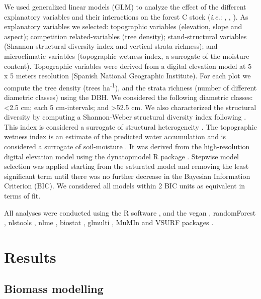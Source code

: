 We used generalized linear models (GLM) to analyze the effect of the different explanatory variables and their interactions on the forest C stock (\emph{i.e.}: \wt, \ws, \wro). As explanatory variables we selected: topographic variables (elevation, slope and aspect); competition related-variables (tree density); stand-structural variables (Shannon structural diversity index and vertical strata richness); and microclimatic variables (topographic wetness index, a surrogate of the moisture content). Topographic variables were derived from a digital elevation model at 5 x 5 meters resolution (Spanish National Geographic Institute). For each plot we compute the tree density (trees ha\textsuperscript{-1}), and the strata richness (number of different diametric classes) using the DBH. We considered the following diametric classes: \textless2.5 cm; each 5 cm-intervals; and \textgreater52.5 cm. We also characterized the structural diversity by computing a Shannon-Weber structural diversity index following \autocite{delRioetal2003IndicesStand}. This index is considered a surrogate of structural heterogeneity \autocite{McElhinnyetal2005ForestWoodland,Gadowetal2012ForestStructure}. The topographic wetness index is an estimate of the predicted water accumulation and is considered a surrogate of soil-moisture \autocites[\emph{e.g.}][]{Zinkoetal2005PlantSpecies,Petrosellietal2013EcologicalBehavior}. It was derived from the high-resolution digital elevation model using the dynatopmodel R package \autocite{Metcalfeetal2018DynatopmodelImplementation}. Stepwise model selection was applied starting from the saturated model and removing the least significant term until there was no further decrease in the Bayesian Information Criterion (BIC). We considered all models within 2 BIC units as equivalent in terms of fit.

All analyses were conducted using the R software \autocite{base}, and the vegan \autocite{vegan}, randomForest \autocite{LiawWiener2002ClassificationRegression}, nlstools \autocite{nlstools}, nlme \autocite{nlme}, biostat \autocite{biostat}, glmulti \autocite{glmulti}, MuMIn \autocite{MuMIn} and VSURF packages \autocite{VSURF}. 

\section{Results}\label{sec:carbon:results}
\subsection{Biomass modelling}\label{sec:carbon:results-modelling}


